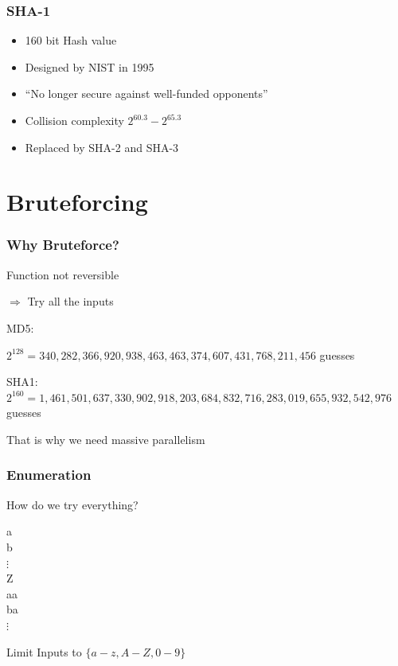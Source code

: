 \documentclass{beamer}
\begin{document}

\begin{frame}
	\frametitle{SHA-1}
	\begin{itemize}
		\item 160 bit Hash value
		\item Designed by NIST in 1995
		\item ``No longer secure against well-funded opponents''
		\item Collision complexity $2^{60.3}-2^{65.3}$
		\item Replaced by SHA-2 and SHA-3
	\end{itemize}
\end{frame}


\section{Bruteforcing}

\begin{frame}
	\frametitle{Why Bruteforce?}
	Function not reversible

	$\Rightarrow$ Try all the inputs

	\vspace{1.5em}
	MD5:

	$2^{128}=340,282,366,920,938,463,463,374,607,431,768,211,456$ guesses

	\vspace{1em}
	SHA1: $2^{160}=1,461,501,637,330,902,918,203,684,832,716,283,019,655,932,542,976$ guesses

	\vspace{1.5em}
	That is why we need massive parallelism
\end{frame}

\begin{frame}
	\frametitle{Enumeration}
	\begin{center}
		How do we try everything?

		\vspace{1em}
		a\\
		b\\
		$\vdots$ \\
		Z\\
		aa\\
		ba\\
		$\vdots$

		\vspace{1em}
		Limit Inputs to $\{a-z, A-Z, 0-9\}$
	\end{center}
\end{frame}
\end{document}
